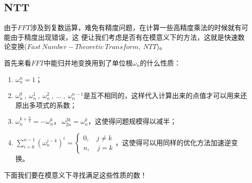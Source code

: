 

\subsection{NTT}
由于$FFT$涉及到复数运算，难免有精度问题，在计算一些高精度乘法的时候就有可能由于精度出现错误，这
便让我们考虑是否有在模意义下的方法，这就是{\heiti 快速数论变换}($Fast\ Number-Theoretic\ Transform,\ NTT$)。

首先来看$FFT$中能归并地变换用到了单位根$\omega_n$的什么性质：
\begin{enumerate}
\item $\omega_n^n = 1$；
\item $\omega_n^0\ ,\ \omega_n^1\ ,\ \omega_n^2\ ,\ ...\ ,\ \omega_n^{n-1}$是互不相同的，这样代入计算出来的点值才可以用来还原出多项式的系数；
\item $\omega_n^{k+\frac{n}{2}}=-\omega_n^{k}$，$\ \omega_{2n}^{2k}=\omega_n^k$，这使得问题规模得以减半；
\item $\sum_{i=0}^{n-1}(\omega_n^{j-k})^i = \left\{\begin{matrix}
0,\quad j\neq k\\ 
n,\quad j= k
\end{matrix}\right.$，这使得可以用同样的优化方法加速逆变换。
\end{enumerate}

下面我们要在模意义下寻找满足这些性质的数！






